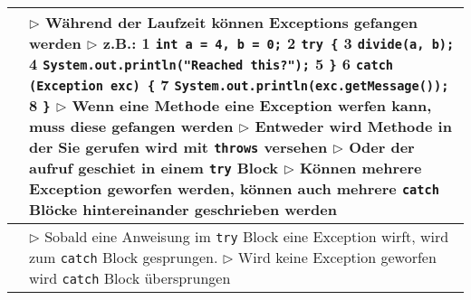 \begin{table}[H]
\begin{tabular}{ | p{4cm} p{13.5cm} | }
	\makecell[l]{Exception fangen} & 
	\makecell[l]
	{
	$\rhd$ Während der Laufzeit können Exceptions gefangen werden \\
	$\rhd$ z.B.: \\
	\hspace{0.5cm} 1 \hspace{0.2cm} \texttt{int a = 4, b = 0;} \\
	\hspace{0.5cm} 2 \hspace{0.2cm} \texttt{try \{} \\
	\hspace{0.5cm} 3 \hspace{0.4cm} \texttt{divide(a, b);} \\
	\hspace{0.5cm} 4 \hspace{0.4cm} \texttt{System.out.println("Reached this?");} \\
	\hspace{0.5cm} 5 \hspace{0.2cm} \texttt{\}} \\
	\hspace{0.5cm} 6 \hspace{0.2cm} \texttt{catch (Exception exc) \{} \\
	\hspace{0.5cm} 7 \hspace{0.4cm} \texttt{System.out.println(exc.getMessage());} \\
	\hspace{0.5cm} 8 \hspace{0.2cm} \texttt{\}} \\
	$\rhd$ Wenn eine Methode eine Exception werfen kann, muss diese gefangen werden \\
	$\rhd$ Entweder wird Methode in der Sie gerufen wird mit \texttt{throws} versehen \\
	$\rhd$ Oder der aufruf geschiet in einem \texttt{try} Block \\
	$\rhd$ Können mehrere Exception geworfen werden, können auch mehrere \texttt{catch} \\
	\hspace{0.4cm} Blöcke hintereinander geschrieben werden
	} 	\\ \hline	


	\makecell[l]{try / catch} & 
	\makecell[l]
	{
	$\rhd$ Sobald eine Anweisung im \texttt{try} Block eine Exception wirft, \\
	\hspace{0.4cm} wird zum \texttt{catch} Block gesprungen. \\
	$\rhd$ Wird keine Exception geworfen wird \texttt{catch} Block übersprungen \\
	} 	\\ \hline	



\end{tabular}
\end{table}
